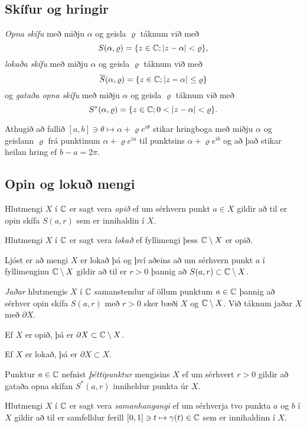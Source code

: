 \subsection*{Skífur og hringir}


{\it Opna skífu} með miðju $\alpha$ og geisla
$\varrho$ táknum við með
$$ S(\alpha,\varrho)={\{z\in {\mathbb C}; |z-\alpha|<\varrho\}}, $$
{\it lokaða skífu} með miðju $\alpha$ og geisla 
$\varrho$ táknum við með
$$ \overline S(\alpha,\varrho)={\{z\in {\mathbb C}; |z-\alpha|\leq\varrho\}} $$
og {\it gataða opna skífu} með miðju $\alpha$ og
geisla $\varrho$ táknum við með
$$ S^*(\alpha,\varrho)=\set{z\in \C; 0<|z-\alpha|<\varrho}. $$


Athugið að fallið $[a,b]\ni \theta\mapsto \alpha+\varrho e^{i\theta}$ stikar
hringboga með miðju $\alpha$ og geislann $\varrho$ frá punktinum
$\alpha+\varrho e^{ia}$
til punktsins $\alpha+\varrho e^{ib}$ og að það stikar heilan hring ef 
$b-a=2\pi$.

\subsection*{Opin og lokuð mengi}

Hlutmengi $X$ í ${\mathbb C}$ er sagt vera {\it opið} ef um sérhvern punkt $a\in X$
gildir að til er opin skífa $S(a,r)$ sem er innihaldin í $X$.

Hlutmengi  $X$ í ${\mathbb C}$ er sagt vera {\it lokað } ef fyllimengi þess
${\mathbb C}\setminus X$ er opið.  

Ljóst er að mengi $X$ er lokað þá og því
aðeins að um sérhvern punkt $a$ í fyllimenginu ${\mathbb C}\setminus X$ gildir
að til er $r>0$ þannig að $S(a,r)\subset {\mathbb C}\setminus X$.  


{\it Jaðar} hlutmengis $X$ í ${\mathbb C}$ samanstendur af öllum punktum
$a\in {\mathbb C}$ þannig að sérhver opin skífa $S(a,r)$ með $r>0$ sker bæði
$X$ og ${\mathbb C}\setminus X$.  Við táknum jaðar $X$ með $\partial X$.  

Ef $X$ er opið, þá er $\partial X\subset {\mathbb C}\setminus X$.

Ef $X$ er lokað, þá er $\partial X\subset X$.   

Punktur $a\in {\mathbb C}$ nefnist {\it þéttipunktur} mengisins $X$ ef um
sérhvert $r>0$ gildir að gataða opna skífan $S^*(a,r)$ inniheldur
punkta úr $X$.  


Hlutmengi $X$ í ${\mathbb C}$ er sagt vera
{\it samanhangangi} ef um sérhverja tvo punkta $a$ og $b$ í 
$X$ gildir að til er samfelldur ferill  
$[0,1]\ni t\mapsto \gamma(t)\in {\mathbb C}$ sem er
innihaldinn í $X$.   

